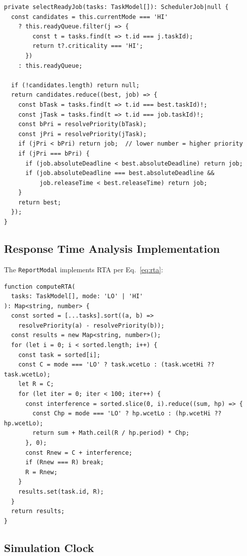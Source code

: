 \documentclass[conference]{IEEEtran}
\begin{document}
\begin{lstlisting}[caption={Job selection (SchedulerEngine.ts)},label={lst:select}]
private selectReadyJob(tasks: TaskModel[]): SchedulerJob|null {
  const candidates = this.currentMode === 'HI'
    ? this.readyQueue.filter(j => {
        const t = tasks.find(t => t.id === j.taskId);
        return t?.criticality === 'HI';
      })
    : this.readyQueue;

  if (!candidates.length) return null;
  return candidates.reduce((best, job) => {
    const bTask = tasks.find(t => t.id === best.taskId)!;
    const jTask = tasks.find(t => t.id === job.taskId)!;
    const bPri = resolvePriority(bTask);
    const jPri = resolvePriority(jTask);
    if (jPri < bPri) return job;  // lower number = higher priority
    if (jPri === bPri) {
      if (job.absoluteDeadline < best.absoluteDeadline) return job;
      if (job.absoluteDeadline === best.absoluteDeadline &&
          job.releaseTime < best.releaseTime) return job;
    }
    return best;
  });
}
\end{lstlisting}

\subsection{Response Time Analysis Implementation}

The \texttt{ReportModal} implements RTA per Eq.~\eqref{eq:rta}:

\begin{lstlisting}[caption={RTA computation (ReportModal.tsx)},label={lst:rta}]
function computeRTA(
  tasks: TaskModel[], mode: 'LO' | 'HI'
): Map<string, number> {
  const sorted = [...tasks].sort((a, b) =>
    resolvePriority(a) - resolvePriority(b));
  const results = new Map<string, number>();
  for (let i = 0; i < sorted.length; i++) {
    const task = sorted[i];
    const C = mode === 'LO' ? task.wcetLo : (task.wcetHi ?? task.wcetLo);
    let R = C;
    for (let iter = 0; iter < 100; iter++) {
      const interference = sorted.slice(0, i).reduce((sum, hp) => {
        const Chp = mode === 'LO' ? hp.wcetLo : (hp.wcetHi ?? hp.wcetLo);
        return sum + Math.ceil(R / hp.period) * Chp;
      }, 0);
      const Rnew = C + interference;
      if (Rnew === R) break;
      R = Rnew;
    }
    results.set(task.id, R);
  }
  return results;
}
\end{lstlisting}

\subsection{Simulation Clock}
\end{document}
